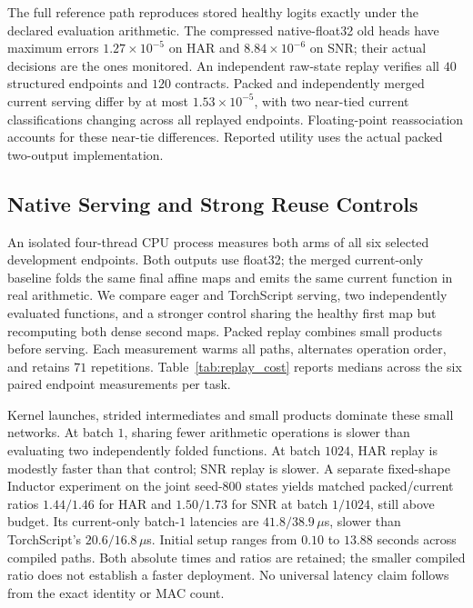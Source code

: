 The full reference path reproduces stored healthy logits exactly under
the declared evaluation arithmetic. The compressed native-float32 old
heads have maximum errors $1.27\times10^{-5}$ on HAR and
$8.84\times10^{-6}$ on SNR; their actual decisions are the ones monitored.
An independent raw-state replay verifies all $40$ structured endpoints and
$120$ contracts. Packed and independently merged current serving differ by
at most $1.53\times10^{-5}$, with two near-tied current classifications
changing across all replayed endpoints. Floating-point reassociation accounts for these near-tie differences.
Reported utility uses the actual packed two-output implementation.

\subsection{Native Serving and Strong Reuse Controls}\label{app:shared_replay_cost}

An isolated four-thread CPU process measures both arms of all six selected
development endpoints. Both outputs use float32; the merged current-only
baseline folds the same final affine maps and emits the same current
function in real arithmetic. We compare eager and TorchScript serving,
two independently evaluated functions, and a stronger control sharing the
healthy first map but recomputing both dense second maps. Packed replay
combines small products before serving. Each measurement warms all paths,
alternates operation order, and retains $71$ repetitions. Table~\ref{tab:replay_cost}
reports medians across the six paired endpoint measurements per task.



Kernel launches, strided intermediates and small products dominate these
small networks. At batch $1$, sharing fewer arithmetic operations is slower
than evaluating two independently folded functions. At batch $1024$, HAR
replay is modestly faster than that control; SNR replay is slower. A separate
fixed-shape Inductor experiment on the joint seed-$800$ states yields
matched packed/current ratios $1.44/1.46$ for HAR and $1.50/1.73$ for SNR
at batch $1/1024$, still above budget. Its current-only batch-$1$ latencies
are $41.8/38.9\,\mu$s, slower than TorchScript's $20.6/16.8\,\mu$s.
Initial setup ranges from $0.10$ to $13.88$ seconds across compiled paths.
Both absolute times and ratios are retained; the smaller compiled ratio
does not establish a faster deployment. No universal latency claim follows
from the exact identity or MAC count.

